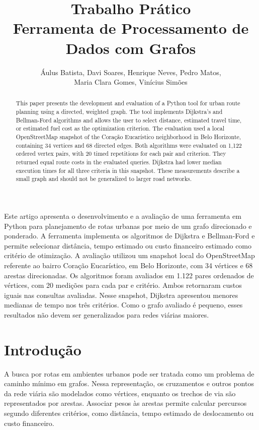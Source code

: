 \documentclass[12pt]{article}
\title{Trabalho Prático\\ Ferramenta de Processamento de Dados com Grafos}
\author{Áulus Batista\inst{1}, Davi Soares\inst{1}, Henrique Neves\inst{1}, Pedro Matos\inst{1}, \\Maria Clara Gomes\inst{1}, Vinícius Simões\inst{1}}
\begin{document}
 

\maketitle

\begin{abstract}
This paper presents the development and evaluation of a Python tool for
urban route planning using a directed, weighted graph. The tool
implements Dijkstra's and Bellman-Ford algorithms and allows the user
to select distance, estimated travel time, or estimated fuel cost as
the optimization criterion. The evaluation used a local OpenStreetMap
snapshot of the Coração Eucarístico neighborhood in Belo Horizonte,
containing 34 vertices and 68 directed edges. Both algorithms were
evaluated on 1,122 ordered vertex pairs, with 20 timed repetitions for
each pair and criterion. They returned equal route costs in the
evaluated queries. Dijkstra had lower median execution times for all
three criteria in this snapshot. These measurements describe a small
graph and should not be generalized to larger road networks.
\end{abstract}

\begin{resumo}
Este artigo apresenta o desenvolvimento e a avaliação de uma ferramenta
em Python para planejamento de rotas urbanas por meio de um grafo
direcionado e ponderado. A ferramenta implementa os algoritmos de
Dijkstra e Bellman-Ford e permite selecionar distância, tempo estimado
ou custo financeiro estimado como critério de otimização. A avaliação
utilizou um snapshot local do OpenStreetMap referente ao bairro Coração
Eucarístico, em Belo Horizonte, com 34 vértices e 68 arestas
direcionadas. Os algoritmos foram avaliados em 1.122 pares ordenados de
vértices, com 20 medições para cada par e critério. Ambos retornaram
custos iguais nas consultas avaliadas. Nesse snapshot, Dijkstra
apresentou menores medianas de tempo nos três critérios. Como o grafo
avaliado é pequeno, esses resultados não devem ser generalizados para
redes viárias maiores.
\end{resumo}

\section{Introdução}
\label{sec:introducao}
A busca por rotas em ambientes urbanos pode ser tratada como um
problema de caminho mínimo em grafos. Nessa representação, os
cruzamentos e outros pontos da rede viária são modelados como vértices,
enquanto os trechos de via são representados por arestas. Associar
pesos às arestas permite calcular percursos segundo diferentes
critérios, como distância, tempo estimado de deslocamento ou custo
financeiro.
\end{document}
